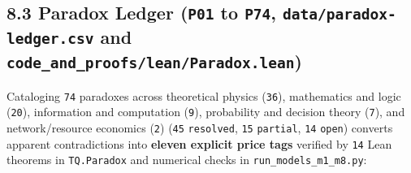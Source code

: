 \documentclass[10pt,letterpaper]{article}
\begin{document}
\subsection{\texorpdfstring{8.3 Paradox Ledger (\texttt{P01} to
\texttt{P74}, \texttt{data/\allowbreak{}paradox-\allowbreak{}ledger.\allowbreak{}csv} and
\texttt{code\_\allowbreak{}and\_\allowbreak{}proofs/\allowbreak{}lean/\allowbreak{}Paradox.\allowbreak{}lean})}{8.3 Paradox Ledger (P01 to P74, data/paradox-ledger.csv and code\_and\_proofs/lean/Paradox.lean)}}\label{paradox-ledger-p01-to-p74-dataparadox-ledger.csv-and-code_and_proofsleanparadox.lean}

Cataloging \texttt{74} paradoxes across theoretical physics
(\texttt{36}), mathematics and logic (\texttt{20}), information and
computation (\texttt{9}), probability and decision theory (\texttt{7}),
and network/resource economics (\texttt{2}) (\texttt{45}
\texttt{resolved}, \texttt{15} \texttt{partial}, \texttt{14}
\texttt{open}) converts apparent contradictions into \textbf{eleven
explicit price tags} verified by \texttt{14} Lean theorems in
\texttt{TQ.\allowbreak{}Paradox} and numerical checks in
\texttt{run\_\allowbreak{}models\_\allowbreak{}m1\_\allowbreak{}m8.\allowbreak{}py}:
\end{document}
